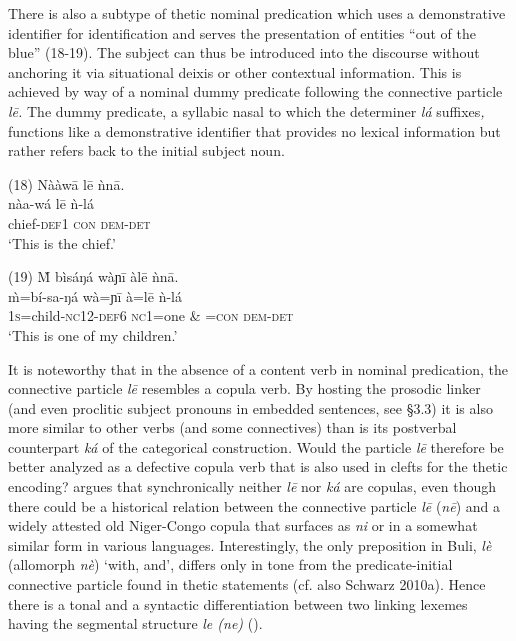 \documentclass[output=paper]{langsci/langscibook}
\begin{document}
There is also a subtype of thetic nominal predication which uses a demonstrative identifier for identification and serves the presentation of entities “out of the blue” (18-19). The subject can thus be introduced into the discourse without anchoring it via situational deixis or other contextual information. This is achieved by way of a nominal dummy predicate following the connective particle \textit{l\={e}. }The dummy predicate, a syllabic nasal to which the determiner \textit{lá }suffixes\textit{, }functions like a demonstrative identifier that provides no lexical information but rather refers back to the initial subject noun.

\ea
\glll \textup{(18)}  Nààw\={a}    l\={e}  ǹn\={a}.\\
  \textup{  nàa-wá    l\={e}  ǹ-lá}\\
       chief-\textsc{def1}  \textsc{con}  \textsc{dem}{}-\textsc{det}\\
\glt ‘This is the chief.’ \citep[88]{Schwarz2007}
\z

\ea
\glll \textup{(19)}  \`{M}   bìsáŋá    wàɲ\={i}    àl\={e}    ǹn\={a}.\\
  \textup{  \`{m}=bí-sa-ŋá    wà=ɲ\={i}    à=l\={e}    ǹ-lá}\\
       1\textsc{s}=child-\textsc{nc}12-\textsc{def}6  \textsc{nc}1=one  \& =\textsc{con}  \textsc{dem-det}\\
\glt ‘This is one of my children.’ \citep[88]{Schwarz2007}
\z

It is noteworthy that in the absence of a content verb in nominal predication, the connective particle \textit{l\={e}} resembles a copula verb. By hosting the prosodic linker (and even proclitic subject pronouns in embedded sentences, see §3.3) it is also more similar to other verbs (and some connectives) than is its postverbal counterpart \textit{ká }of the categorical construction\textit{. }Would the particle \textit{l\={e} }therefore be better analyzed as a defective copula verb that is also used in clefts for the thetic encoding? \citet{Schwarz2009} argues that synchronically neither \textit{l\={e} }nor \textit{ká} are copulas, even though there could be a historical relation between the connective particle \textit{l\={e} }(\textit{n\={e}}) and a widely attested old Niger-Congo copula that surfaces as \textit{ni }or in a somewhat similar form in various languages. Interestingly, the only preposition in Buli, \textit{lè }(allomorph \textit{nè}) ‘with, and’, differs only in tone from the predicate-initial connective particle found in thetic statements (cf. also Schwarz 2010a). Hence there is a tonal and a syntactic differentiation between two linking lexemes having the segmental structure \textit{le (ne) }().
\end{document}
